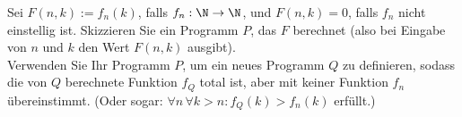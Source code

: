 
\begin{exercise}[206]

Sei $F(n,k) := f_n(k)$, falls $f_n: \N \to \N$, und $F(n,k) = 0$, falls $f_n$
nicht einstellig ist. Skizzieren Sie ein Programm $P$, das $F$ berechnet
(also bei Eingabe von $n$ und $k$ den Wert $F(n,k)$ ausgibt). \\


Verwenden Sie Ihr Programm $P$, um ein neues Programm $Q$ zu definieren, sodass
die von $Q$ berechnete Funktion $f_Q$ total ist, aber mit keiner Funktion $f_n$
übereinstimmt. (Oder sogar: $\forall n\,\forall k > n: f_Q(k) > f_n(k)$ erfüllt.)
\end{exercise}


\begin{solution}

\phantom{}

\end{solution}
